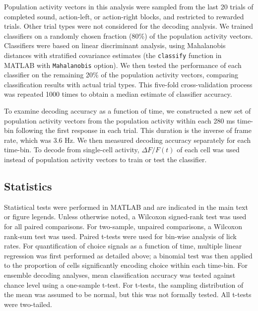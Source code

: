 Population activity vectors in this analysis were sampled from the last 20 trials of completed sound, action-left, or action-right blocks, and restricted to rewarded trials. Other trial types were not considered for the decoding analysis. We trained classifiers on a randomly chosen fraction (80\%) of the population activity vectors. Classifiers were based on linear discriminant analysis, using Mahalanobis distances with stratified covariance estimates (the \texttt{classify} function in MATLAB with \texttt{Mahalanobis} option). We then tested the performance of each classifier on the remaining 20\% of the population activity vectors, comparing classification results with actual trial types. This five-fold cross-validation process was repeated \num{1000} times to obtain a median estimate of classifier accuracy. 

To examine decoding accuracy as a function of time, we constructed a new set of population activity vectors from the population activity within each 280 ms time-bin following the first response in each trial. This duration is the inverse of frame rate, which was 3.6 Hz. We then measured decoding accuracy separately for each time-bin. To decode from single-cell activity, $\Delta F/F (t)$ of each cell was used instead of population activity vectors to train or test the classifier.

\subsection*{Statistics}
Statistical tests were performed in MATLAB and are indicated in the main text or figure legends. Unless otherwise noted, a Wilcoxon signed-rank test was used for all paired comparisons. For two-sample, unpaired comparisons, a Wilcoxon rank-sum test was used. Paired t-tests were used for bin-wise analysis of lick rates. For quantification of choice signals as a function of time, multiple linear regression was first performed as detailed above; a binomial test was then applied to the proportion of cells significantly encoding choice within each time-bin. For ensemble decoding analyses, mean classification accuracy was tested against chance level using a one-sample t-test. For t-tests, the sampling distribution of the mean was assumed to be normal, but this was not formally tested. All t-tests were two-tailed.